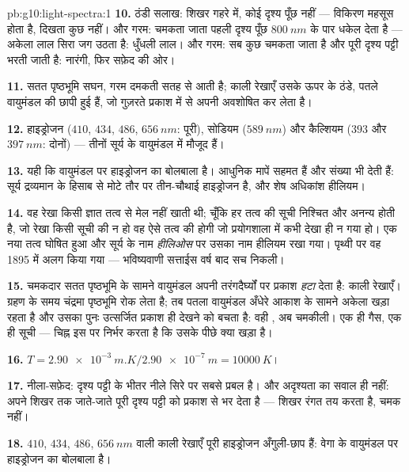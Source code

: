 \begin{solution}{pb:g10:light-spectra:1}
\textbf{10.} ठंडी सलाख: शिखर गहरे  में, कोई दृश्य पूँछ
नहीं --- विकिरण महसूस होता है, दिखता कुछ नहीं। और गरम: चमकता जाता
 पहली दृश्य पूँछ $\qty{800}{nm}$ के पार धकेल देता है --- अकेला
लाल सिरा जग उठता है: धुँधली लाल। और गरम: सब कुछ चमकता जाता है और पूरी
दृश्य पट्टी भरती जाती है: नारंगी, फिर सफ़ेद की ओर।

\textbf{11.} सतत पृष्ठभूमि सघन, गरम दमकती सतह से आती है; काली रेखाएँ
उसके ऊपर के ठंडे, पतले वायुमंडल की छापी हुई हैं, जो गुज़रते प्रकाश में
से अपनी  अवशोषित कर लेता है।

\textbf{12.} हाइड्रोजन ($410$, $434$, $486$, $\qty{656}{nm}$: पूरी),
सोडियम ($\qty{589}{nm}$) और कैल्शियम ($393$ और $\qty{397}{nm}$: दोनों) --- तीनों
सूर्य के वायुमंडल में मौजूद हैं।

\textbf{13.} यही कि वायुमंडल पर हाइड्रोजन का बोलबाला है। आधुनिक मापें
सहमत हैं और संख्या भी देती हैं: सूर्य द्रव्यमान के हिसाब से मोटे तौर पर
तीन-चौथाई हाइड्रोजन है, और शेष अधिकांश हीलियम।

\textbf{14.} वह रेखा किसी ज्ञात तत्व से मेल नहीं खाती थी; चूँकि हर तत्व
की सूची निश्चित और अनन्य होती है, जो रेखा किसी सूची की न हो वह ऐसे तत्व
की होगी जो प्रयोगशाला में कभी देखा ही न गया हो। एक नया तत्व घोषित हुआ
और सूर्य के नाम \emph{हीलिओस} पर उसका नाम हीलियम रखा गया। पृथ्वी पर वह
1895 में अलग किया गया --- भविष्यवाणी सत्ताईस वर्ष बाद सच निकली।

\textbf{15.} चमकदार सतत पृष्ठभूमि के सामने वायुमंडल अपनी
तरंगदैर्घ्यों पर प्रकाश \emph{हटा} देता है: काली रेखाएँ।
ग्रहण के समय चंद्रमा पृष्ठभूमि रोक लेता है; तब पतला वायुमंडल अँधेरे
आकाश के सामने अकेला खड़ा रहता है और उसका पुनः उत्सर्जित प्रकाश ही देखने
को बचता है: वही , अब चमकीली। एक ही गैस, एक ही सूची
--- चिह्न इस पर निर्भर करता है कि उसके पीछे क्या खड़ा है।

\textbf{16.} $T = \qty{2.90e-3}{m.K} / \qty{2.90e-7}{m}
= \qty{10000}{K}$।

\textbf{17.} नीला-सफ़ेद: दृश्य पट्टी के भीतर  नीले
सिरे पर सबसे प्रबल है। और अदृश्यता का सवाल ही नहीं:  अपने  शिखर तक जाते-जाते पूरी दृश्य पट्टी
को प्रकाश से भर देता है --- शिखर रंगत तय करता है, चमक नहीं।

\textbf{18.} $410$, $434$, $486$, $\qty{656}{nm}$ वाली काली रेखाएँ पूरी
हाइड्रोजन अँगुली-छाप हैं: वेगा के वायुमंडल पर हाइड्रोजन का बोलबाला है।


\end{solution}
